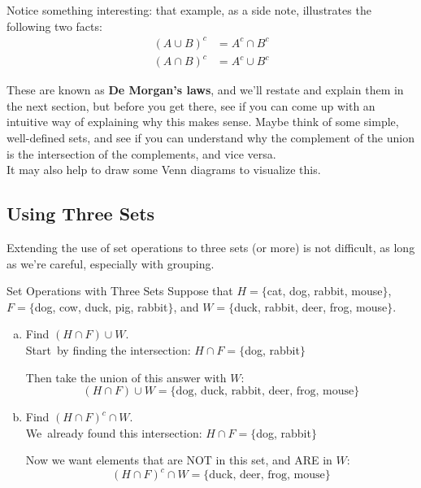 Notice something interesting: that example, as a side note, illustrates the following two facts:
\begin{align*}
(A \cup B)^c &= A^c \cap B^c\\
(A \cap B)^c &= A^c \cup B^c
\end{align*}

These are known as \textbf{De Morgan's laws}, and we'll restate and explain them in the next section, but before you get there, see if you can come up with an intuitive way of explaining why this makes sense.  Maybe think of some simple, well-defined sets, and see if you can understand why the complement of the union is the intersection of the complements, and vice versa.\\

It may also help to draw some Venn diagrams to visualize this.
\vfill
\pagebreak

\subsection{Using Three Sets}

Extending the use of set operations to three sets (or more) is not difficult, as long as we're careful, especially with grouping.

\begin{example}[https://www.youtube.com/watch?v=6Ghk61fjkcM]{Set Operations with Three Sets}
Suppose that $H=\{$cat, dog, rabbit, mouse$\}$, $F=\{$dog, cow, duck, pig, rabbit$\}$, and $W=\{$duck, rabbit, deer, frog, mouse$\}$.

\begin{enumerate}[(a)]
\item Find $(H \cap F) \cup W$.\\

Start\sol\ by finding the intersection: $H \cap F = \{$dog, rabbit$\}$

Then take the union of this answer with $W$:
\[(H \cap F) \cup W = \{\textrm{dog, duck, rabbit, deer, frog, mouse}\}\]

\item Find $(H \cap F)^c \cap W$.\\

We\sol\ already found this intersection: $H \cap F = \{$dog, rabbit$\}$

Now we want elements that are NOT in this set, and ARE in $W$:
\[(H \cap F)^c \cap W = \{\textrm{duck, deer, frog, mouse}\}\]
\end{enumerate}
\end{example}

